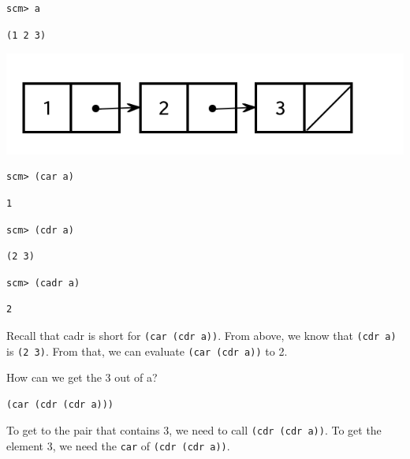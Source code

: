 \begin{lstlisting}
scm> a
\end{lstlisting}
\begin{solution}[.25in]
\begin{lstlisting}
(1 2 3)
\end{lstlisting}
\includegraphics[scale=0.7]{scheme_lists_6}
\end{solution}

\begin{lstlisting}
scm> (car a)
\end{lstlisting}
\begin{solution}[.25in]
\begin{lstlisting}
1
\end{lstlisting}
\end{solution}

\begin{lstlisting}
scm> (cdr a)
\end{lstlisting}
\begin{solution}[.25in]
\begin{lstlisting}
(2 3)
\end{lstlisting}
\end{solution}

\begin{lstlisting}
scm> (cadr a)
\end{lstlisting}
\begin{solution}[.25in]
\begin{lstlisting}
2
\end{lstlisting}
Recall that cadr is short for \texttt{(car (cdr a))}. From above, we know that \texttt{(cdr a)} is \texttt{(2 3)}. From that, we can evaluate \texttt{(car (cdr a))} to 2.
\end{solution}

How can we get the 3 out of a?
\begin{solution}[.25in]
\begin{lstlisting}
(car (cdr (cdr a)))
\end{lstlisting}
To get to the pair that contains 3, we need to call \texttt{(cdr (cdr a))}. To get the element 3, we need the \texttt{car} of \texttt{(cdr (cdr a))}.
\end{solution}

